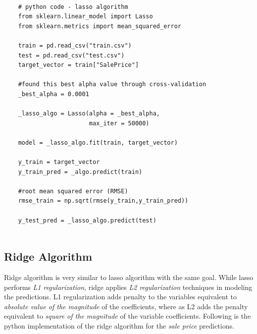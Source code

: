 \documentclass[sigconf]{acmart}
\begin{document}
	\begin{verbatim}
	
	# python code - lasso algorithm
	from sklearn.linear_model import Lasso
	from sklearn.metrics import mean_squared_error
	
	train = pd.read_csv("train.csv")
	test = pd.read_csv("test.csv")
	target_vector = train["SalePrice"]
	
	#found this best alpha value through cross-validation
	_best_alpha = 0.0001	
	
	_lasso_algo = Lasso(alpha = _best_alpha, 
	                    max_iter = 50000)
	
	model = _lasso_algo.fit(train, target_vector)  
		
	y_train = target_vector
	y_train_pred = _algo.predict(train)
	
	#root mean squared error (RMSE)
	rmse_train = np.sqrt(rmse(y_train,y_train_pred))
		
	y_test_pred = _lasso_algo.predict(test)	
	
	\end{verbatim}
	
	
	\subsection{Ridge Algorithm}
	
	Ridge algorithm is very similar to lasso algorithm with the same goal. While lasso performs {\em L1 regularization}, ridge applies {\em L2 regularization} techniques in modeling the predictions. L1 regularization adds penalty to the variables equivalent to {\em absolute value of the magnitude} of the coefficients, where as L2 adds the penalty equivalent to {\em square of the magnitude} of the variable coefficients. Following is the python implementation of the ridge algorithm for the {\em sale price} predictions. 
	
\end{document}
